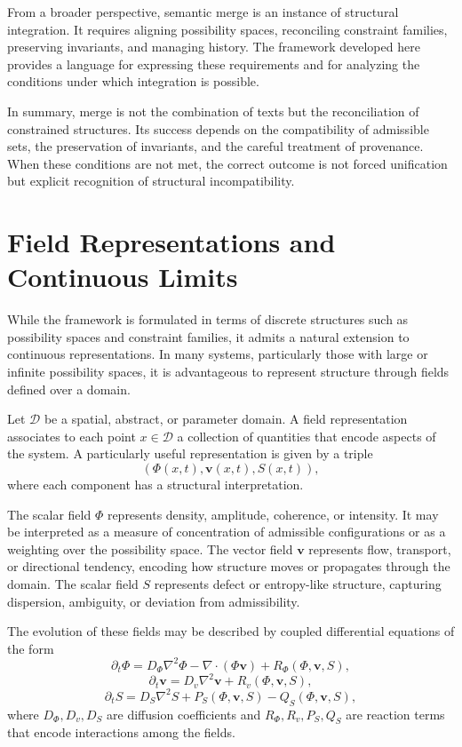 \documentclass[11pt,oneside]{article}
\begin{document}
From a broader perspective, semantic merge is an instance of structural integration. It requires aligning possibility spaces, reconciling constraint families, preserving invariants, and managing history. The framework developed here provides a language for expressing these requirements and for analyzing the conditions under which integration is possible.

In summary, merge is not the combination of texts but the reconciliation of constrained structures. Its success depends on the compatibility of admissible sets, the preservation of invariants, and the careful treatment of provenance. When these conditions are not met, the correct outcome is not forced unification but explicit recognition of structural incompatibility.

\section{Field Representations and Continuous Limits}

While the framework is formulated in terms of discrete structures such as possibility spaces and constraint families, it admits a natural extension to continuous representations. In many systems, particularly those with large or infinite possibility spaces, it is advantageous to represent structure through fields defined over a domain.

Let \( \mathcal{D} \) be a spatial, abstract, or parameter domain. A field representation associates to each point \( x \in \mathcal{D} \) a collection of quantities that encode aspects of the system. A particularly useful representation is given by a triple
\[
(\Phi(x,t), \mathbf{v}(x,t), S(x,t)),
\]
where each component has a structural interpretation.

The scalar field \( \Phi \) represents density, amplitude, coherence, or intensity. It may be interpreted as a measure of concentration of admissible configurations or as a weighting over the possibility space. The vector field \( \mathbf{v} \) represents flow, transport, or directional tendency, encoding how structure moves or propagates through the domain. The scalar field \( S \) represents defect or entropy-like structure, capturing dispersion, ambiguity, or deviation from admissibility.

The evolution of these fields may be described by coupled differential equations of the form
\[
\partial_t \Phi = D_{\Phi} \nabla^2 \Phi - \nabla \cdot (\Phi \mathbf{v}) + R_{\Phi}(\Phi, \mathbf{v}, S),
\]
\[
\partial_t \mathbf{v} = D_v \nabla^2 \mathbf{v} + R_v(\Phi, \mathbf{v}, S),
\]
\[
\partial_t S = D_S \nabla^2 S + P_S(\Phi, \mathbf{v}, S) - Q_S(\Phi, \mathbf{v}, S),
\]
where \( D_{\Phi}, D_v, D_S \) are diffusion coefficients and \( R_{\Phi}, R_v, P_S, Q_S \) are reaction terms that encode interactions among the fields.
\end{document}
